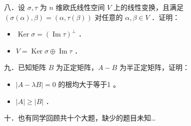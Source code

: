 \documentclass{article}
\begin{document}
八．设 \(\sigma, \tau\) 为 \(n\) 维欧氏线性空间 \(V\) 上的线性变换，且满足 \((\sigma(\alpha), \beta)=(\alpha, \tau(\beta))\) 对任意的 \(\alpha, \beta \in V\) ．证明：

\begin{itemize}
  \item[（1）] \(\operatorname{Ker} \sigma=(\operatorname{Im} \tau)^{\perp}\) ．
  \item[（2）] \(V=\operatorname{Ker} \sigma \oplus \operatorname{Im} \tau\) ．
\end{itemize}

九．已知矩阵 \(B\) 为正定矩阵，\(A-B\) 为半正定矩阵，证明：

\begin{itemize}
  \item[（1）] \(|A-\lambda B|=0\) 的根均大于等于1 。
  \item[（2）] \(|A| \geq|B|\) ．
\end{itemize}

十．也有同学回顾共十个大题，缺少的题目未知…
\end{document}
